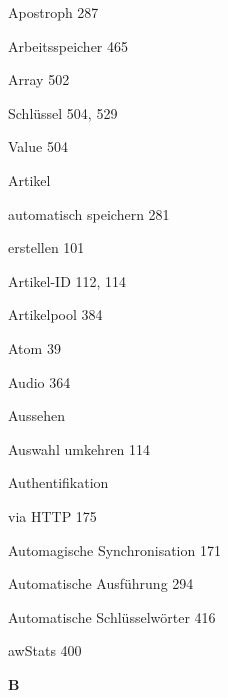 \documentclass{book}
\renewcommand\indexspace{\vspace{11pt}}
\renewcommand\subitem{\par}
\begin{document}
\begin{multicols}{2}
\begin{osp-index}
  \item Apostroph\hspace{1mm} 287
  \item Arbeitsspeicher\hspace{1mm} 465
  \item Array\hspace{1mm} 502
    \subitem Schl\"ussel\hspace{1mm} 504, 529
    \subitem Value\hspace{1mm} 504
  \item Artikel
    \subitem automatisch speichern\hspace{1mm} 281
    \subitem erstellen\hspace{1mm} 101
  \item Artikel-ID\hspace{1mm} 112, 114
  \item Artikelpool\hspace{1mm} 384
  \item Atom\hspace{1mm} 39
  \item Audio\hspace{1mm} 364
  \item Aussehen\hspace{1mm} 
  \item Auswahl umkehren\hspace{1mm} 114
  \item Authentifikation
    \subitem via HTTP\hspace{1mm} 175
  \item Automagische Synchronisation\hspace{1mm} 171
  \item Automatische Ausf\"uhrung\hspace{1mm} 294
  \item Automatische Schl\"usselw\"orter\hspace{1mm} 416
  \item awStats\hspace{1mm} 400

  \indexspace
{\sffamily\bfseries B}\nopagebreak


\end{osp-index}
\end{multicols}
\end{document}
